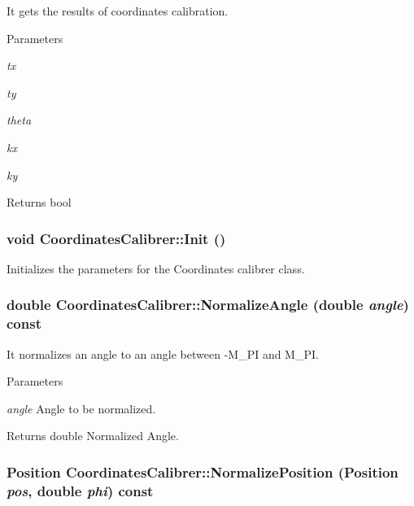 It gets the results of coordinates calibration. 


\begin{DoxyParams}{Parameters}
\item[{\em tx}]\item[{\em ty}]\item[{\em theta}]\item[{\em kx}]\item[{\em ky}]\end{DoxyParams}
\begin{DoxyReturn}{Returns}
bool 
\end{DoxyReturn}
\hypertarget{classCoordinatesCalibrer_a19faab9e443f7ef64462a36c19baf6bc}{
\subsubsection[{Init}]{\setlength{\rightskip}{0pt plus 5cm}void CoordinatesCalibrer::Init ()}}
\label{classCoordinatesCalibrer_a19faab9e443f7ef64462a36c19baf6bc}


Initializes the parameters for the Coordinates calibrer class. 

\hypertarget{classCoordinatesCalibrer_acae6b5f07cf198f9c85a1b09e9a275dc}{
\subsubsection[{NormalizeAngle}]{\setlength{\rightskip}{0pt plus 5cm}double CoordinatesCalibrer::NormalizeAngle (double {\em angle}) const}}
\label{classCoordinatesCalibrer_acae6b5f07cf198f9c85a1b09e9a275dc}


It normalizes an angle to an angle between -\/M\_\-PI and M\_\-PI. 


\begin{DoxyParams}{Parameters}
\item[{\em angle}]Angle to be normalized. \end{DoxyParams}
\begin{DoxyReturn}{Returns}
double Normalized Angle. 
\end{DoxyReturn}
\hypertarget{classCoordinatesCalibrer_a034180f011c23565b9b5907ce0219fbf}{
\subsubsection[{NormalizePosition}]{\setlength{\rightskip}{0pt plus 5cm}Position CoordinatesCalibrer::NormalizePosition (Position {\em pos}, \/  double {\em phi}) const}}
\label{classCoordinatesCalibrer_a034180f011c23565b9b5907ce0219fbf}


